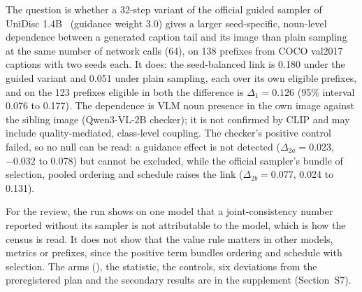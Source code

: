 The question is whether a 32-step variant of the official guided sampler of UniDisc 1.4B~\cite{arXiv:2503.20853} (guidance weight 3.0) gives a larger seed-specific, noun-level dependence between a generated caption tail and its image than plain sampling at the same number of network calls (64), on 138 prefixes from COCO val2017 captions with two seeds each. It does: the seed-balanced link is 0.180 under the guided variant and 0.051 under plain sampling, each over its own eligible prefixes, and on the 123 prefixes eligible in both the difference is $\Delta_1=0.126$ (95\% interval 0.076 to 0.177). The dependence is VLM noun presence in the own image against the sibling image (Qwen3-VL-2B checker); it is not confirmed by CLIP and may include quality-mediated, class-level coupling. The checker's positive control failed, so no null can be read: a guidance effect is not detected ($\Delta_{2a}=0.023$, $-0.032$ to 0.078) but cannot be excluded, while the official sampler's bundle of selection, pooled ordering and schedule raises the link ($\Delta_{2b}=0.077$, 0.024 to 0.131). %

For the review, the run shows on one model that a joint-consistency number reported without its sampler is not attributable to the model, which is how the census is read. It does not show that the value rule matters in other models, metrics or prefixes, since the positive term bundles ordering and schedule with selection. The arms (\suppTabExp{}), the statistic, the controls, six deviations from the preregistered plan and the secondary results are in the supplement (Section~S7). %
